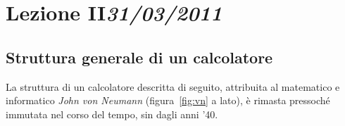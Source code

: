 \chapter[Lezione II]{Lezione II\newline\small{\emph{31/03/2011}}}
	\section{Struttura generale di un calcolatore}
	\label{sec:neu}




La struttura di un calcolatore descritta di seguito, attribuita al matematico e informatico \emph{John von Neumann} (figura~\ref{fig:vn} a lato), è rimasta pressoché immutata nel corso del tempo, sin dagli anni '40.
